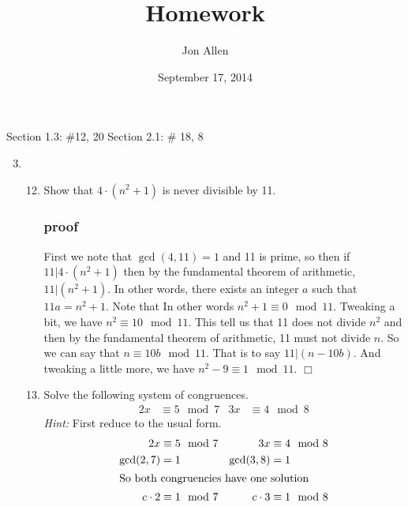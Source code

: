\documentclass[letterpaper]{article}
\begin{document}
\title{Homework}
\date{September 17, 2014}
\author{Jon Allen}
\maketitle
Section 1.3: \#12, 20
Section 2.1: \# 18, 8
\renewcommand{\labelenumi}{1.\arabic{enumi}}
\renewcommand{\labelenumii}{\arabic{enumii}.}
\renewcommand{\labelenumiii}{(\alph{enumiii})}
\begin{enumerate}
\setcounter{enumi}{2}
\item
\begin{enumerate}
\setcounter{enumii}{11}
\item
Show that $4\cdot(n^2+1)$ is never divisible by 11.
\subsubsection*{proof}
First we note that $\gcd(4,11)=1$ and 11 is prime, so then if $11|4\cdot(n^2+1)$ then by the fundamental theorem of arithmetic, $11|(n^2+1)$.
In other words, there exists an integer $a$ such that $11a=n^2+1$.
Note that 
In other words $n^2+1\equiv0\mod11$.
Tweaking a bit, we have $n^2\equiv10\mod11$.
This tell us that 11 does not divide $n^2$ and then by the fundamental theorem of arithmetic, 11 must not divide $n$. So we can say that $n\equiv10b\mod11$. That is to say  $11|(n-10b)$. 
And tweaking a little more, we have $n^2-9\equiv1\mod11$.
$\Box$
\setcounter{enumii}{19}
\item
Solve the following system of congruences.
\begin{align*}
  2x&\equiv 5\mod 7&3x&\equiv4\mod 8
\end{align*}
\emph{Hint:} First reduce to the usual form.
\begin{align*}
  2x&\equiv 5\mod 7&3x&\equiv4\mod 8\\
  \gcd(2,7)&=1&\gcd(3,8)&=1\\
  \intertext{So both congruencies have one solution}
  c\cdot2&\equiv1\mod 7&c\cdot3&\equiv1\mod8\\

\end{align*}
\end{enumerate}
\end{enumerate}
\end{document}
